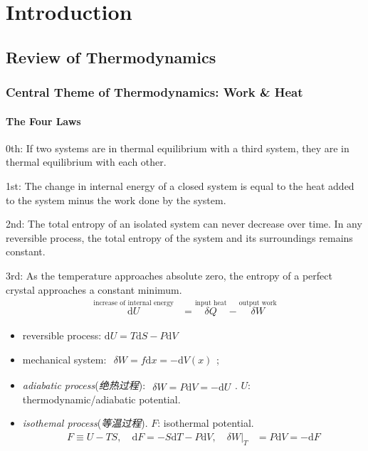 \documentclass[../../main.tex]{subfiles}
\begin{document}
\section{Introduction}
\subsection{Review of Thermodynamics}
\subsubsection{Central Theme of Thermodynamics: Work \& Heat}
\paragraph{The Four Laws}
    
0th: If two systems are in thermal equilibrium with a third system, they are in thermal equilibrium with each other.

1st: The change in internal energy of a closed system is equal to the heat added to the system minus the work done by the system.

2nd: The total entropy of an isolated system can never decrease over time. In any reversible process, the total entropy of the system and its surroundings remains constant.

3rd: As the temperature approaches absolute zero, the entropy of a perfect crystal approaches a constant minimum.
\begin{align*}
    \stackrel{\text{increase of internal energy}}{\mathrm{d}U} &= \stackrel{\text{input heat}}{\delta Q }- \stackrel{\text{output work}}{\delta W}
\end{align*}
\begin{itemize}
    \item reversible process: $\mathrm{d}U = T\mathrm{d}S - P\mathrm{d}V$
    \item mechanical system: $\begin{aligned}
        \delta W = f\mathrm{d}x = -\mathrm{d}V(x)
    \end{aligned}$;
    \item \textit{adiabatic process}(\textit{绝热过程}): $\begin{aligned}
        \delta W = P\mathrm{d}V = -\mathrm{d}U
    \end{aligned}$. $U$: thermodynamic/adiabatic potential.
    \item \textit{isothemal process}(\textit{等温过程}). $F$: isothermal potential.
    \begin{align*}
        F \equiv U - TS, \quad\mathrm{d}F = -S\mathrm{d}T - P\mathrm{d}V,\quad \delta W\bigg|_{T} &= P\mathrm{d}V = -\mathrm{d}F
    \end{align*}
\end{itemize}
\end{document}

